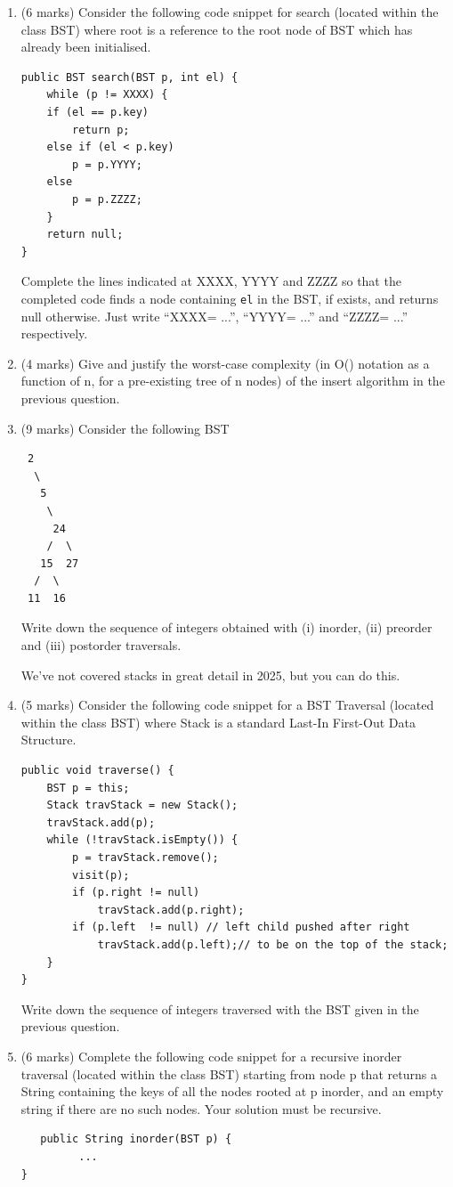\documentclass[twoside=false,DIV=14]{scrartcl}
\begin{document}
\begin{enumerate}
\item (6 marks) Consider the following code snippet for search (located within the class BST) where root is a reference to the root node of BST which has already been initialised.
\begin{lstlisting}
public BST search(BST p, int el) {
    while (p != XXXX) {
    if (el == p.key)
        return p;
    else if (el < p.key)
        p = p.YYYY;
    else
        p = p.ZZZZ;
    }
    return null;
}
\end{lstlisting}
Complete the lines indicated at XXXX, YYYY and ZZZZ so that the completed code finds a node containing \verb+el+ in the BST, if exists, and returns null otherwise. Just write “XXXX= ...”, “YYYY= ...” and “ZZZZ= ...” respectively.
\item (4 marks) Give and justify the worst-case complexity (in O() notation as a function of n, for a pre-existing tree of n nodes) of the insert algorithm in the previous question.
\item (9 marks) Consider the following BST 
\begin{verbatim}
 2
  \
   5
    \ 
     24
    /  \ 
   15  27
  /  \ 
 11  16
\end{verbatim}
Write down the sequence of integers obtained with (i) inorder, (ii) preorder and (iii) postorder traversals.
\begin{note}
We've not covered stacks in great detail in 2025, but you can do this.
\end{note}
\item (5 marks) Consider the following code snippet for a BST Traversal (located within the class BST) where Stack is a standard Last-In First-Out Data Structure.
\begin{lstlisting}
public void traverse() {
    BST p = this;
    Stack travStack = new Stack();
    travStack.add(p);
    while (!travStack.isEmpty()) {
        p = travStack.remove();
        visit(p);
        if (p.right != null)
            travStack.add(p.right);
        if (p.left  != null) // left child pushed after right
            travStack.add(p.left);// to be on the top of the stack;
    }
}
\end{lstlisting}
Write down the sequence of integers traversed with the BST given in the previous question.
\item (6 marks) Complete the following code snippet for a recursive inorder traversal (located within the class BST) starting from node p that returns a String containing the keys of all the nodes rooted at p inorder, and an empty string if there are no such nodes. Your solution must be recursive.
\begin{lstlisting}
   public String inorder(BST p) {
         ...
}
\end{lstlisting}
\end{enumerate}
 
\end{document}

